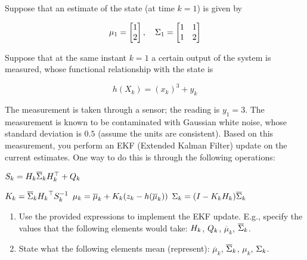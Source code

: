 \documentclass[final]{lcc}
\begin{document}
    Suppose that an estimate of the state (at time $k = 1$) is given by

    \begin{equation*}
    \mu_{1} = \begin{bmatrix} 1 \\ 2 \end{bmatrix}, \quad \Sigma_{1} = \begin{bmatrix} 1 & 1 \\ 1 & 2 \end{bmatrix}
    \end{equation*}

    Suppose that at the same instant $k=1$ a certain output of the system is measured, whose functional relationship with the state is

    \begin{equation*}
    h\left(X_{k}\right) = \left(x_{k}\right)^3 + y_{k}
    \end{equation*}

    The measurement is taken through a sensor; the reading is $y_{1} = 3$. The measurement is known to be contaminated with Gaussian white noise, whose standard deviation is $0.5$ (assume the units are consistent). Based on this measurement, you perform an EKF (Extended Kalman Filter) update on the current estimates. One way to do this is through the following operations: 

    \begin{algorithmic}[1] 
    \State $S_{k} = H_{k} \overline{\Sigma}_{k} H_{k}^{\top} + Q_{k} $ 

    \State $K_{k} = \overline{\Sigma}_{k} {H_{k}}^{\top} S_{k}^{-1} $ 
    \State $\mu_{k} = \overline{\mu}_{k} + K_{k}(z_{k} - h(\overline{\mu}_{k}))$ 
    \State $\Sigma_{k} = (I - K_{k}H_{k})\overline{\Sigma}_{k}$
    \end{algorithmic}

    \begin{enumerate}
    \item Use the provided expressions to implement the EKF update. E.g., specify the values that the following elements would take: $H_{k}$, $Q_{k}$, $\overline{\mu}_{k}$, $\overline{\Sigma}_{k}$.
    \item State what the following elements mean (represent): $\overline{\mu}_{k}$, $\overline{\Sigma}_{k}$, $\mu_{k}$, $\Sigma_{k}$.
    \end{enumerate}
\end{document}
